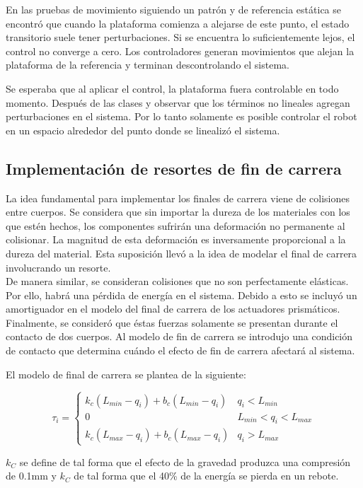 En las pruebas de movimiento siguiendo un patrón y de referencia estática se encontró que cuando la plataforma comienza a alejarse de este punto, el estado transitorio suele tener perturbaciones.
Si se encuentra lo suficientemente lejos, el control no converge a cero.
Los controladores generan movimientos que alejan la plataforma de la referencia y terminan descontrolando el sistema.

Se esperaba que al aplicar el control, la plataforma fuera controlable en todo momento. 
Después de las clases y observar que los términos 
no lineales agregan perturbaciones en el sistema.
Por lo tanto solamente es posible controlar el robot en un espacio alrededor del punto donde se linealizó el sistema.


\subsection{Implementación de resortes de fin de carrera}
La idea fundamental para implementar los finales de carrera viene de colisiones entre cuerpos.
Se considera que sin importar la dureza de los materiales con los que estén hechos, los componentes sufrirán una deformación no permanente al colisionar.
La magnitud de esta deformación es inversamente proporcional a la dureza del material. 
Esta suposición llevó a la idea de modelar el final de carrera involucrando un resorte.\\

De manera similar, se consideran colisiones que no son perfectamente elásticas. 
Por ello, habrá una pérdida de energía en el sistema.
Debido a esto se incluyó un amortiguador en el modelo del final de carrera de los actuadores prismáticos.\\

Finalmente, se consideró que éstas fuerzas solamente se presentan durante el contacto de dos cuerpos. 
Al modelo de fin de carrera se introdujo una condición de contacto que determina cuándo el efecto de fin de carrera afectará al sistema.


El modelo de final de carrera se plantea de la siguiente:
 
 \begin{equation}
     \tau_{i} = \begin{cases}
     k_c\left( L_{min}-q_i\right) + b_c\left( L_{min}-q_i\right) &   q_i < L_{min}\\
     0 &   L_{min} < q_i < L_{max}\\
     k_c\left( L_{max}-q_i\right) + b_c\left( L_{max}-q_i\right) &   q_i > L_{max}
     \end{cases}
 \end{equation}
 
 $k_C$ se define de tal forma que el efecto de la gravedad produzca una compresión de 0.1mm y $k_C$ de tal forma que el 40\% de la energía se pierda en un rebote.